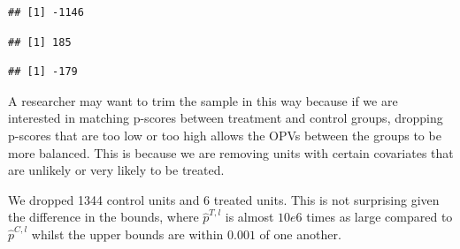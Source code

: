 \documentclass[
]{article}
\newenvironment{Shaded}{\begin{snugshade}}{\end{snugshade}}
\newcommand{\DecValTok}[1]{\textcolor[rgb]{0.00,0.00,0.81}{#1}}
\newcommand{\FunctionTok}[1]{\textcolor[rgb]{0.13,0.29,0.53}{\textbf{#1}}}
\newcommand{\NormalTok}[1]{#1}
\newcommand{\SpecialCharTok}[1]{\textcolor[rgb]{0.81,0.36,0.00}{\textbf{#1}}}
\begin{document}
\begin{verbatim}
## [1] -1146
\end{verbatim}

\begin{Shaded}
\end{Shaded}

\begin{verbatim}
## [1] 185
\end{verbatim}

\begin{Shaded}
\end{Shaded}

\begin{verbatim}
## [1] -179
\end{verbatim}

A researcher may want to trim the sample in this way because if we are
interested in matching p-scores between treatment and control groups,
dropping p-scores that are too low or too high allows the OPVs between
the groups to be more balanced. This is because we are removing units
with certain covariates that are unlikely or very likely to be treated.

We dropped 1344 control units and 6 treated units. This is not
surprising given the difference in the bounds, where \(\hat{p}^{T,l}\)
is almost \(10e6\) times as large compared to \(\hat{p}^{C,l}\) whilst
the upper bounds are within \(0.001\) of one another.
\end{document}
